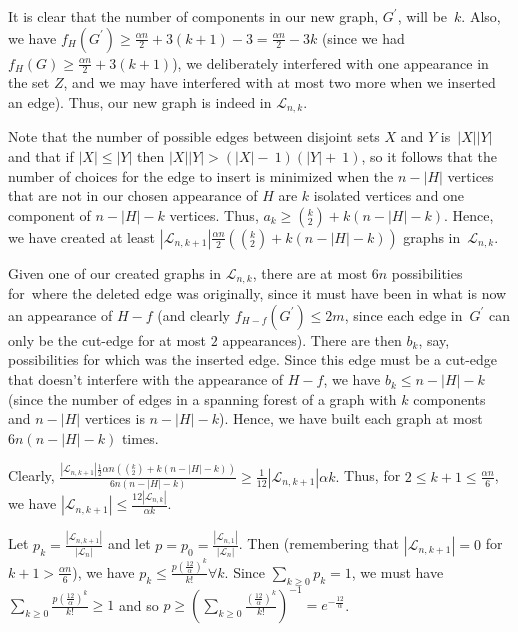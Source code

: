 \documentclass{article}
\newtheorem{Proof of Theorem}{Proof of Theorem}
\begin{document}
It is clear that the number of components in our new graph, $G^{\prime}$, will be~$k$.
Also, we have $f_{H}(G^{\prime}) \geq \frac{\alpha n}{2} + 3(k+1) - 3 = \frac{\alpha n}{2} - 3k$
(since we had $f_{H}(G) \geq \frac{\alpha n}{2} + 3(k+1)$), 
we deliberately interfered with one appearance in the set $Z$,
and we may have interfered with at most two more when we inserted an edge).
Thus, our new graph is indeed in $\mathcal{L}_{n,k}$.

Note that the number of possible edges between disjoint sets $X$ and $Y$ is~$|X||Y|$ and that
if $|X| \leq |Y|$ then $|X||Y| > (|X|-~1)(|Y|+~1)$,
so it follows that the number of choices for the edge to insert is minimized when 
the $n-|H|$ vertices that are not in our chosen appearance of $H$ are $k$ isolated vertices and 
one component of $n-|H|-k$ vertices.
Thus, \mbox{$a_{k} \geq \left( ^{k} _{2} \right) + k(n-|H|-k)$.}
Hence, we have created at least 
$|\mathcal{L}_{n,k+1}| \frac{\alpha n}{2} \left( \left( ^{k} _{2} \right) + k(n-|H|-k) \right)$ 
graphs in~$\mathcal{L}_{n,k}$.

Given one of our created graphs in $\mathcal{L}_{n,k}$, 
there are at most $6n$ possibilities for~where the deleted edge was originally, 
since it must have been in what is now an appearance of $H - f$
(and clearly $f_{H-f} \left( G^{\prime} \right) \leq 2m$,
since each edge in~$G^{\prime}$ can only be the cut-edge for at most $2$ appearances).
There are then $b_{k}$, say, possibilities for which was the inserted edge.
Since this edge must be a cut-edge that doesn't interfere with the appearance of $H - f$,
we have $b_{k} \leq n-|H|-k$ 
(since the number of edges in a spanning forest of a graph with $k$ components and $n-|H|$ vertices is $n-|H|-k$).
Hence, we have built each graph at most $6n(n-|H|-k)$ times.

Clearly, 
$
\frac{|\mathcal{L}_{n,k+1}| \frac{1}{2} \alpha n \left( \left( ^{k} _{2} \right) + k(n-|H|-k) \right)} {6n(n-|H|-k)} 
\geq \frac{1}{12} |\mathcal{L}_{n,k+1}| \alpha k.
$
Thus, for $2 \!\leq\! k+1 \!\leq\! \frac{\alpha n}{6}$, we have
$|\mathcal{L}_{n,k+1}| \leq \frac{12|\mathcal{L}_{n,k}|}{\alpha k}$.

Let $p_{k} = \frac{|\mathcal{L}_{n,k+1}|}{|\mathcal{L}_{n}|}$
and let $p = p_{0} = \frac{|\mathcal{L}_{n,1}|}{|\mathcal{L}_{n}|}$.
Then (remembering that $|\mathcal{L}_{n,k+1}| = 0$ for $k+1 > \frac{\alpha n}{6}$),
we have $p_{k} \leq \frac{p(\frac{12}{\alpha})^{k}}{k!} \forall k$.
Since $\sum_{k \geq 0} p_{k} = 1$, we must have $\sum_{k \geq 0} \frac{p(\frac{12}{\alpha})^{k}}{k!} \geq 1$
and so $p \geq \left( \sum_{k \geq 0} \frac{(\frac{12}{\alpha})^{k}}{k!} \right)^{-1} = e^{-\frac{12}{\alpha}}$.
\end{document}
